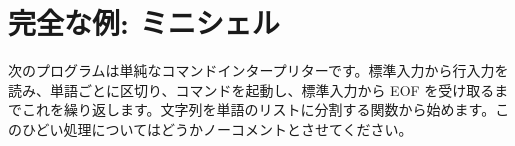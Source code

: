 \section{完全な例: ミニシェル}

次のプログラムは単純なコマンドインタープリターです。標準入力から行入力を読み、単語ごとに区切り、コマンドを起動し、標準入力から EOF を受け取るまでこれを繰り返します。文字列を単語のリストに分割する関数から始めます。このひどい処理についてはどうかノーコメントとさせてください。

